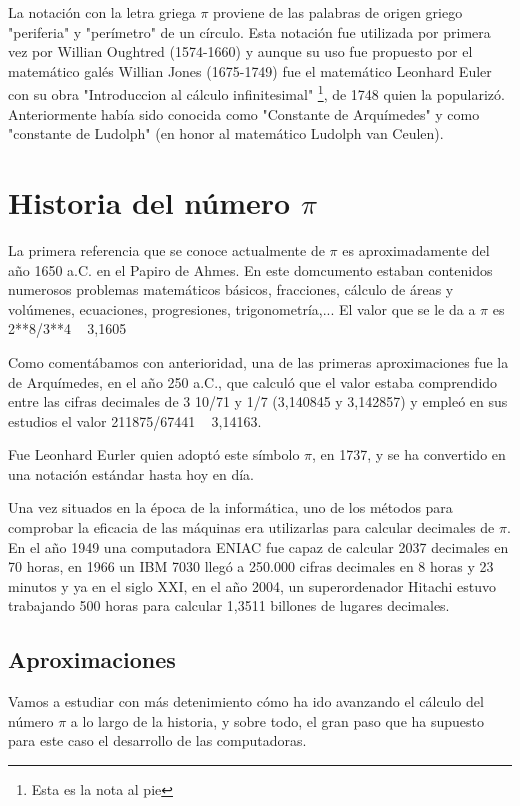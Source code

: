 \documentclass[spanish,a4paper,10pt]{article}
\begin{document}
La notación con la letra griega $\pi$ proviene de las palabras de origen griego "periferia" y "perímetro" de un círculo.
Esta notación fue utilizada por primera vez por Willian Oughtred (1574-1660) y aunque su uso fue propuesto por el matemático galés Willian Jones (1675-1749) fue el matemático Leonhard Euler con su obra "Introduccion al cálculo infinitesimal" \footnote{Esta es la nota al pie}, de 1748 quien la popularizó. 
Anteriormente había sido conocida como "Constante de Arquímedes" y como "constante de Ludolph" (en honor al matemático Ludolph van Ceulen).\cite{URL:HTTP}

\pagebreak
\section{Historia del número $\pi$}

La primera referencia que se conoce actualmente de $\pi$ es aproximadamente del año 1650 a.C. en el Papiro de Ahmes. En este domcumento estaban contenidos numerosos problemas matemáticos básicos, fracciones, cálculo de áreas y volúmenes, ecuaciones, progresiones, trigonometría,... 
El valor que se le da a $\pi$ es 2**8/3**4 ~ 3,1605


Como comentábamos con anterioridad, una de las primeras aproximaciones fue la de Arquímedes, en el año 250 a.C., que calculó que el valor estaba comprendido entre las cifras decimales de 3 10/71 y 1/7 (3,140845 y 3,142857) y empleó en sus estudios el valor 211875/67441 ~ 3,14163.

Fue Leonhard Eurler quien adoptó este símbolo $\pi$, en 1737, y se ha convertido en una notación estándar hasta hoy en día. 

Una vez situados en la época de la informática, uno de los métodos para comprobar la eficacia de las máquinas era utilizarlas para calcular decimales de $\pi$. En el año 1949 una computadora ENIAC fue capaz de calcular 2037 decimales en 70 horas, en 1966 un IBM 7030 llegó a 250.000 cifras decimales en 8 horas y 23 minutos y ya en el siglo XXI, en el año 2004, un superordenador Hitachi estuvo trabajando 500 horas para calcular 1,3511 billones de lugares decimales.

\subsection{Aproximaciones}

Vamos a estudiar con más detenimiento cómo ha ido avanzando el cálculo del número $\pi$ a lo largo de la historia, y sobre todo, el gran paso que ha supuesto para este caso el desarrollo de las computadoras.
\end{document}
